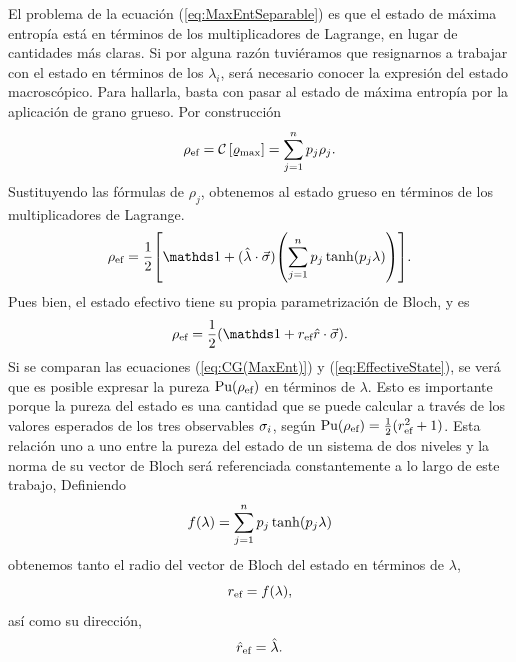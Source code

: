El problema de la ecuación (\ref{eq:MaxEntSeparable}) es que el estado de máxima entropía está en términos de los multiplicadores de Lagrange, en lugar de cantidades más claras. Si por alguna razón tuviéramos que resignarnos a trabajar con el estado en términos de los $\lambda_{i}$, será necesario conocer la expresión del estado macroscópico. Para hallarla, basta con pasar al estado de máxima entropía por la aplicación de grano grueso. Por construcción 
\begin{equation}
    \rho_{\text{ef}}=\mathcal{C}\left[\varrho_{\max}\right]=\sum_{j=1}^{n}p_{j}\rho_{j}.\nonumber
\end{equation}
Sustituyendo las fórmulas de $\rho_{j}$, obtenemos al estado grueso en términos de los multiplicadores de Lagrange.
\begin{equation}\label{eq:CG(MaxEnt)}
    \rho_{\ef}=\frac{1}{2}\qty[\Id+(\paulivec{\lambda})\qty(\sum_{j=1}^{n}p_{j}\tanh(p_{j}\lambda))].
\end{equation}
Pues bien, el estado efectivo tiene su propia parametrización de Bloch, y es
\begin{equation}\label{eq:EffectiveState}
    \rho_{\ef}=\frac{1}{2}(\Id+r_{\ef}\paulivec{r}).
\end{equation}
Si se comparan las ecuaciones (\ref*{eq:CG(MaxEnt)}) y (\ref*{eq:EffectiveState}), se verá que es posible expresar la pureza $\text{Pu}(\rho_{\text{ef}})$ en términos de $\lambda$. Esto es importante porque la pureza del estado es una cantidad que se puede calcular a través de los valores esperados de los tres observables $\sigma_{i}$, según $\text{Pu}(\rho_{\text{ef}})=\frac{1}{2}(r_{\text{ef}}^{2}+1)$. Esta relación uno a uno entre la pureza del estado de un sistema de dos niveles y la norma de su vector de Bloch será referenciada constantemente a lo largo de este trabajo,  Definiendo
\begin{equation}\label{eq:r(lambda)}
    f(\lambda)=\sum_{j=1}^{n}p_{j}\tanh(p_{j}\lambda)
\end{equation}
obtenemos tanto el radio del vector de Bloch del estado en términos de $\lambda$,
\begin{equation}
    r_{\text{ef}}=f(\lambda),\nonumber
\end{equation}
así como su dirección,
\begin{equation}
    \hat{r}_{\text{ef}}=\hat{\lambda}.\nonumber
\end{equation}

